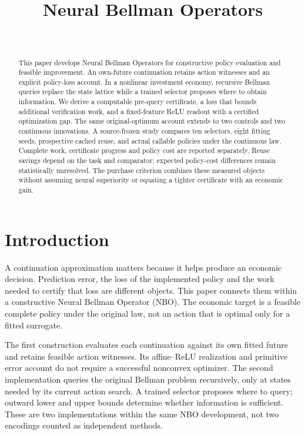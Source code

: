 \documentclass[ecta,nameyear,draft]{econsocart}
\begin{document}
\begin{frontmatter}
\title{Neural Bellman Operators}
\begin{aug}
\author[id=au1,addressref={add1}]{~}
\address[id=add1]{Peking University}
\end{aug}
\begin{abstract}
This paper develops Neural Bellman Operators for constructive policy evaluation and feasible improvement. An own-future continuation retains action witnesses and an explicit policy-loss account. In a nonlinear investment economy, recursive Bellman queries replace the state lattice while a trained selector proposes where to obtain information. We derive a computable pre-query certificate, a loss that bounds additional verification work, and a fixed-feature ReLU readout with a certified optimization gap. The same original-optimum account extends to two controls and two continuous innovations. A source-frozen study compares ten selectors, eight fitting seeds, prospective cached reuse, and actual callable policies under the continuous law. Complete work, certificate progress and policy cost are reported separately. Reuse savings depend on the task and comparator; expected policy-cost differences remain statistically unresolved. The purchase criterion combines these measured objects without assuming neural superiority or equating a tighter certificate with an economic gain.
\end{abstract}
\begin{keyword}
\end{keyword}
\end{frontmatter}
\section{Introduction}\label{sec:introduction65}
A continuation approximation matters because it helps produce an economic decision. Prediction error, the loss of the implemented policy and the work needed to certify that loss are different objects. This paper connects them within a constructive Neural Bellman Operator (NBO). The economic target is a feasible complete policy under the original law, not an action that is optimal only for a fitted surrogate.

The first construction evaluates each continuation against its own fitted future and retains feasible action witnesses. Its affine--ReLU realization and primitive error account do not require a successful nonconvex optimizer. The second implementation queries the original Bellman problem recursively, only at states needed by its current action search. A trained selector proposes where to query; outward lower and upper bounds determine whether information is sufficient. These are two implementations within the same NBO development, not two encodings counted as independent methods.
\end{document}
